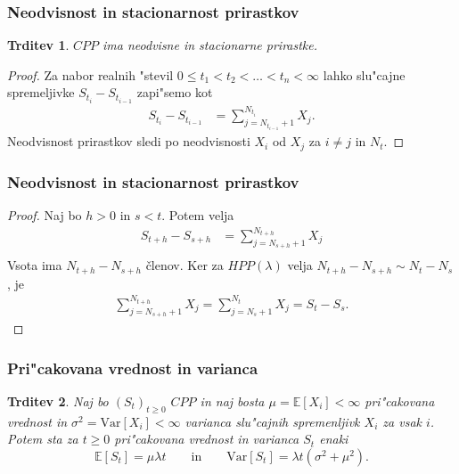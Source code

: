 \documentclass[]{beamer} %
\theoremstyle{plain}
\newtheorem{trditev}{Trditev}
\newcommand{\E}{\mathbb{E}}
\newcommand{\1}{\mathds{1}}
\newcommand{\Var}[1]{\text{Var}\left[#1\right]}
\begin{document}
\begin{frame}
    \frametitle{Neodvisnost in stacionarnost prirastkov}
    \begin{trditev}
        $CPP$ ima neodvisne in stacionarne prirastke.
        \label{trd:neodvPrirCPP}
    \end{trditev}
    \pause
    \begin{proof}
        Za nabor realnih "stevil $0 \leq t_1 < t_2 < \ldots < t_n < \infty$ lahko slu"cajne
        spremeljivke $S_{t_i} - S_{t_{i-1}}$ zapi"semo kot
        \begin{align*}
            S_{t_i} - S_{t_{i-1}} &= \sum_{j=N_{t_{i-1}}+1}^{N_{t_i}} X_j. 
        \end{align*}
        Neodvisnost prirastkov sledi po neodvisnosti $X_i$ od $X_j$ za $i\neq j$ in $N_t$. 
        \phantom\qedhere 
    \end{proof}
\end{frame}

\begin{frame}
    \frametitle{Neodvisnost in stacionarnost prirastkov}
    \begin{proof}
        Naj bo $h > 0$ in $s < t$. Potem velja
        \begin{align*}
            S_{t+h} - S_{s+h} &= \sum_{j=N_{s+h}+1}^{N_{t+h}} X_j \\
        \end{align*}
        Vsota ima $N_{t+h} - N_{s+h}$ členov. Ker za $HPP(\lambda)$ velja 
        $N_{t+h} - N_{s+h} \sim N_t - N_s$, je 
        \begin{align*}
            \sum_{j=N_{s+h}+1}^{N_{t+h}} X_j = \sum_{j=N_{s}+1}^{N_{t}} X_j = S_t - S_s.
        \end{align*}
    \end{proof}
\end{frame}



\begin{frame}
    \frametitle{Pri"cakovana vrednost in varianca}
    \begin{trditev}
        Naj bo $(S_t)_{t\geq 0}$ $CPP$ in naj bosta $\mu = \E\left[X_i\right] < \infty$ 
        pri"cakovana vrednost in $\sigma^2= \Var{X_i} <\infty$ varianca
        slu"cajnih spremenljivk $X_i$ za vsak $i$. Potem sta za $t\geq0$ pri"cakovana vrednost in 
        varianca $S_t$ enaki 
        \begin{equation*}
            \E\left[S_t\right] = \mu\lambda t \qquad \text{in} \qquad \Var{S_t} = \lambda t\left(\sigma^2 + \mu^2\right).
        \end{equation*}
        \label{trd:PricVarCPP}
    \end{trditev}
\end{frame}
\end{document}
